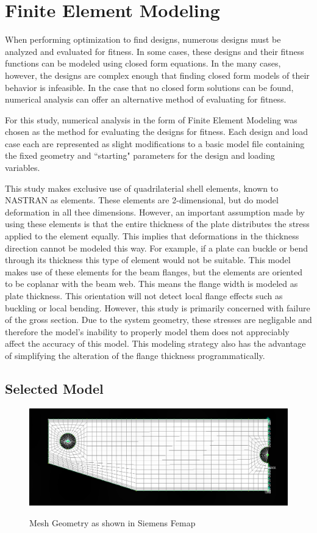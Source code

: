 \section{Finite Element Modeling}

When performing optimization to find designs, numerous designs must be analyzed and evaluated for fitness. In some cases, these designs and their fitness functions can be modeled using closed form equations. In the many cases, however, the designs are complex enough that finding closed form models of their behavior is infeasible. In the case that no closed form solutions can be found, numerical analysis can offer an alternative method of evaluating for fitness. 

For this study, numerical analysis in the form of Finite Element Modeling was chosen as the method for evaluating the designs for fitness. Each design and load case each are represented as slight modifications to a basic model file containing the fixed geometry and ``starting" parameters for the design and loading variables.  

This study makes exclusive use of quadrilaterial shell elements, known to NASTRAN as  elements. These elements are 2-dimensional, but do model deformation in all thee dimensions. However, an important assumption made by using these elements is that the entire thickness of the plate distributes the stress applied to the element equally. This implies that deformations in the thickness direction cannot be modeled this way. For example, if a plate can buckle or bend through its thickness this type of element would not be suitable. This model makes use of these elements for the beam flanges, but the elements are oriented to be coplanar with the beam web. This means the flange width is modeled as plate thickness. This orientation will not detect local flange effects such as buckling or local bending. However, this study is primarily concerned with failure of the gross section. Due to the system geometry, these stresses are negligable and therefore the model's inability to properly model them does not appreciably affect the accuracy of this model. This modeling strategy also has the advantage of simplifying the alteration of the flange thickness programmatically. 

\subsection{Selected Model}

\begin{figure}
\includegraphics[width=\textwidth]{img/mesh_geom.png}
\label{img:mesh_geom}
\caption{Mesh Geometry as shown in Siemens Femap}
\end{figure}
